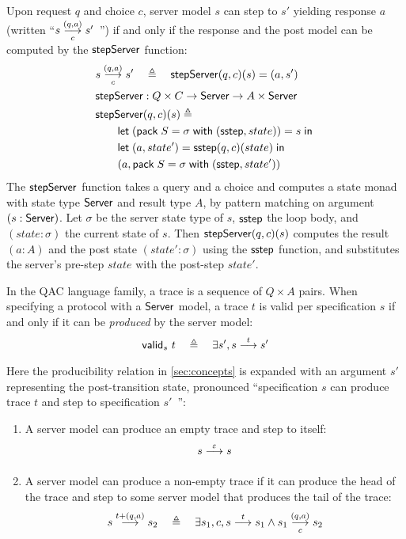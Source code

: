 \begin{definition}
  \label{def:server-step}
  Upon request $q$ and choice $c$, server model $s$ can step to $s'$ yielding
  response $a$ (written ``$\triggers sc{(q,a)}s'$~'') if and only if the
  response and the post model can be computed by the $\mathsf{stepServer}$ function:
\begin{align*}
  &\triggers sc{(q,a)}s'\quad\triangleq\quad\stepServer(q,c)(s)=(a,s')\\
  &\stepServer:Q\times C \to \Server \to A\times \Server \\
  &\stepServer(q,c)(s)\triangleq\\
  &\qquad\letin{(\existT{S}{\sigma}{(\sstep, state)})}{s}\\
  &\qquad\letin{(a,state')}{\sstep(q,c)(state)} \\
  &\qquad(a, \existT{S}{\sigma}{(\sstep, state')})
\end{align*}
The $\mathsf{stepServer}$ function takes a query and a choice and computes a state monad
with state type $\mathsf{Server}$ and result type $A$, by pattern matching on argument
$(s:\mathsf{Server})$.  Let $\sigma$ be the server state type of $s$, $\mathsf{sstep}$ the loop
body, and $(state:\sigma)$ the current state of $s$.  Then $\mathsf{stepServer}(q,c)(s)$
computes the result $(a:A)$ and the post state $(state':\sigma)$ using the
$\mathsf{sstep}$ function, and substitutes the server's pre-step $state$ with the
post-step $state'$.
\end{definition}

\begin{definition}
  \label{def:trace-validity}
  In the QAC language family, a trace is a sequence of $Q\times A$ pairs.  When
  specifying a protocol with a $\mathsf{Server}$ model, a trace $t$ is valid per
  specification $s$ if and only if it can be {\em produced} by the server model:
  \[\valid s t\quad\triangleq\quad\exists s',\behaves s t s'\]
  Here the producibility relation in \autoref{sec:concepts} is expanded with an
  argument $s'$ representing the post-transition state, pronounced
  ``specification $s$ can produce trace $t$ and step to specification $s'$~'':
  \begin{enumerate}
  \item A server model can produce an empty trace and step to itself:
    \[\behaves s \nil s\]
  \item A server model can produce a non-empty trace if it can produce the head
    of the trace and step to some server model that produces the tail of the
    trace:
    \[\behaves s {t+(q,a)} s_2\quad\triangleq\quad\exists s_1,c,\behaves s t s_1\wedge\triggers {s_1}c{(q,a)}s_2\]
  \end{enumerate}
\end{definition}

